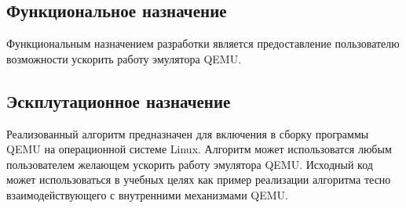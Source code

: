 \subsection{Функциональное назначение}
Функциональным назначением разработки является предоставление пользователю возможности ускорить работу эмулятора QEMU.

\subsection{Эскплутационное назначение}
Реализованный алгоритм предназначен для включения в сборку программы QEMU на операционной системе Linux. Алгоритм может использоватся любым пользователем желающем ускорить работу эмулятора QEMU. Исходный код может использоваться в учебных целях как пример реализации алгоритма тесно взаимодействующего с внутренними механизмами QEMU.